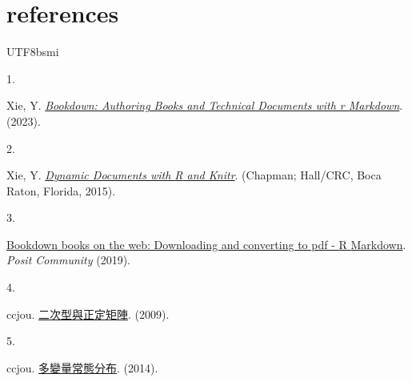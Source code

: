 \documentclass[
]{book}
\newlength{\cslhangindent}
\newlength{\csllabelwidth}
\newlength{\cslentryspacingunit} %
\newenvironment{CSLReferences}[2] %
 {%
  \setlength{\parindent}{0pt}
  \ifodd #1
  \let\oldpar\par
  \def\par{\hangindent=\cslhangindent\oldpar}
  \fi
  \setlength{\parskip}{#2\cslentryspacingunit}
 }%
 {}
\newcommand{\CSLLeftMargin}[1]{\parbox[t]{\csllabelwidth}{#1}}
\newcommand{\CSLRightInline}[1]{\parbox[t]{\linewidth - \csllabelwidth}{#1}\break}
\theoremstyle{definition}
\theoremstyle{definition}
\theoremstyle{definition}
\theoremstyle{definition}
\theoremstyle{remark}
\begin{document}
\hypertarget{references}{%
\chapter*{references}\label{references}}
\begin{CJK}{UTF8}{bsmi}
\hypertarget{refs}{}
\begin{CSLReferences}{0}{0}
\leavevmode{}%
\CSLLeftMargin{1. }%
\CSLRightInline{Xie, Y. \emph{\href{https://github.com/rstudio/bookdown}{Bookdown: Authoring Books and Technical Documents with r Markdown}}. (2023).}

\leavevmode{}%
\CSLLeftMargin{2. }%
\CSLRightInline{Xie, Y. \emph{\href{http://yihui.org/knitr/}{Dynamic Documents with {R} and Knitr}}. (Chapman; Hall/CRC, Boca Raton, Florida, 2015).}

\leavevmode{}%
\CSLLeftMargin{3. }%
\CSLRightInline{\href{https://community.rstudio.com/t/bookdown-books-on-the-web-downloading-and-converting-to-pdf/30268}{Bookdown books on the web: Downloading and converting to pdf - {R} {Markdown}}. \emph{Posit Community} (2019).}

\leavevmode{}%
\CSLLeftMargin{4. }%
\CSLRightInline{ccjou. \href{https://ccjou.wordpress.com/2009/10/21/\%e4\%ba\%8c\%e6\%ac\%a1\%e5\%9e\%8b\%e8\%88\%87\%e6\%ad\%a3\%e5\%ae\%9a\%e7\%9f\%a9\%e9\%99\%a3/}{二次型與正定矩陣}. (2009).}

\leavevmode{}%
\CSLLeftMargin{5. }%
\CSLRightInline{ccjou. \href{https://ccjou.wordpress.com/2014/06/05/\%e5\%a4\%9a\%e8\%ae\%8a\%e9\%87\%8f\%e5\%b8\%b8\%e6\%85\%8b\%e5\%88\%86\%e5\%b8\%83/}{多變量常態分布}. (2014).}

\end{CSLReferences}
\end{CJK}
\end{document}
